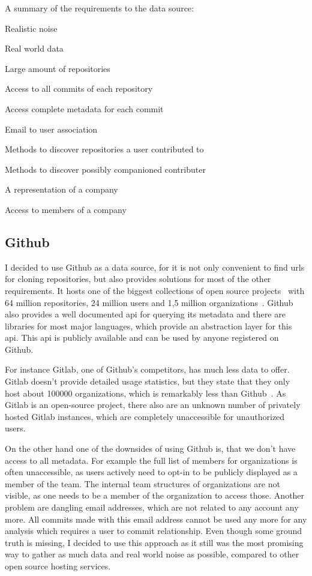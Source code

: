 \begin{itemlist}{A summary of the requirements to the data source:}
    \item Realistic noise
    \item Real world data
    \item Large amount of repositories
    \item Access to all commits of each repository
    \item Access complete metadata for each commit
    \item Email to user association
    \item Methods to discover repositories a user contributed to
    \item Methods to discover possibly companioned contributer
    \item A representation of a company
    \item Access to members of a company
\end{itemlist}


\subsection{Github}\label{github}
I decided to use Github as a data source, for it is not only convenient to find \acp{url} for cloning repositories, but also provides solutions for most of the other requirements.
It hosts one of the biggest collections of open source projects~\cite{techreport:how-github-conquered} with 64 million repositories, 24 million users and 1,5 million organizations~\cite{article:github-statistics}.
Github also provides a well documented \ac{api} for querying its metadata and there are libraries for most major languages, which provide an abstraction layer for this \ac{api}.
This \ac{api} is publicly available and can be used by anyone registered on Github.

For instance Gitlab, one of Github's competitors, has much less data to offer.
Gitlab doesn't provide detailed usage statistics, but they state that they only host about 100000 organizations, which is remarkably less than Github~\cite{article:gitlab-help}.
As Gitlab is an open-source project, there also are an unknown number of privately hosted Gitlab instances, which are completely unaccessible for unauthorized users.

On the other hand one of the downsides of using Github is, that we don't have access to all metadata.
For example the full list of members for organizations is often unaccessible, as users actively need to opt-in to be publicly displayed as a member of the team.
The internal team structures of organizations are not visible, as one needs to be a member of the organization to access those.
Another problem are dangling email addresses, which are not related to any account any more.
All commits made with this email address cannot be used any more for any analysis which requires a user to commit relationship.
Even though some ground truth is missing, I decided to use this approach as it still was the most promising way to gather as much data and real world noise as possible, compared to other open source hosting services.

